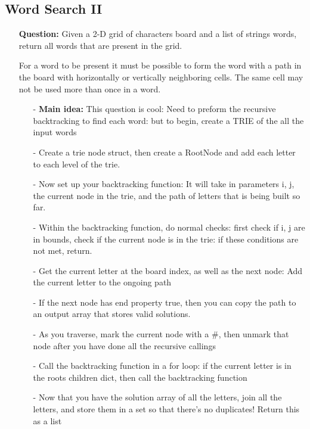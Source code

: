 \documentclass[12pt]{article}
\begin{document}
\subsection{Word Search II}
\begin{enumerate}
  \item[] \textbf{Question:} Given a 2-D grid of characters board and a list of strings words, return all words that are present in the grid.

For a word to be present it must be possible to form the word with a path in the board with horizontally or vertically neighboring cells. The same cell may not be used more than once in a word.

    \begin{enumerate}
      \item[-] \textbf{Main idea:} This question is cool: Need to preform the recursive backtracking to find each word: but to begin, create a TRIE of the all the input words
      \item[-] Create a trie node struct, then create a RootNode and add each letter to each level of the trie.
      \item[-] Now set up your backtracking function: It will take in parameters i, j, the current node in the trie, and the path of letters that is being built so far.
      \item[-] Within the backtracking function, do normal checks: first check if i, j are in bounds, check if the current node is in the trie: if these conditions are not met, return. 
      \item[-] Get the current letter at the board index, as well as the next node: Add the current letter to the ongoing path
      \item[-] If the next node has end property true, then you can copy the path to an output array that stores valid solutions.
      \item[-] As you traverse, mark the current node with a \#, then unmark that node after you have done all the recursive callings
      \item[-] Call the backtracking function in a for loop: if the current letter is in the roots children dict, then call the backtracking function
      \item[-] Now that you have the solution array of all the letters, join all the letters, and store them in a set so that there's no duplicates! Return this as a list

    \end{enumerate}
\end{enumerate}
\end{document}
